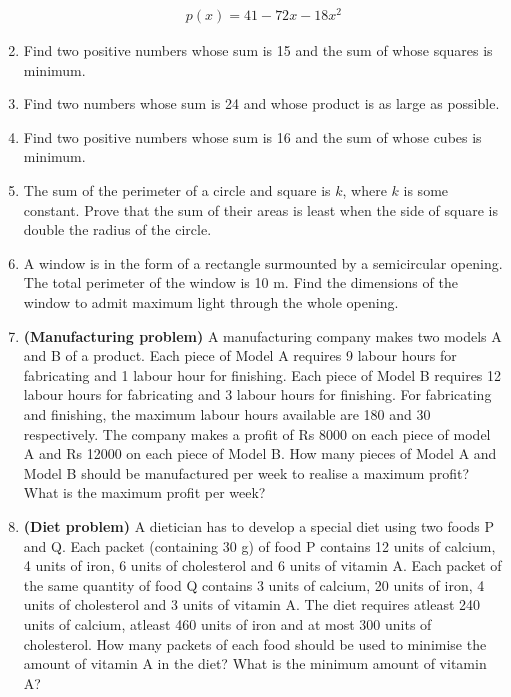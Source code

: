 \begin{enumerate}[label=\arabic*.,ref=\thesubsection.\theenumi]
\begin{align}
p(x) = 41-72x - 18x^2
\end{align}
%
\item Find two positive numbers whose sum is 15 and the sum of whose squares is minimum.
\item Find two numbers whose sum is 24 and whose product is as large as possible.
\item Find two positive numbers whose sum is 16 and the sum of whose cubes is minimum.
\item The sum of the perimeter of a circle and square is $k$, where $k$ is some constant. Prove that the sum of their areas is least when the side of square is double the radius of the circle.
\item A window is in the form of a rectangle surmounted by a semicircular opening. The total perimeter of the window is 10 m. Find the dimensions of the window to admit maximum light through the whole opening.
\item  \textbf{(Manufacturing problem)} A manufacturing company makes two models
A and B of a product. Each piece of Model A requires 9 labour hours for fabricating
and 1 labour hour for finishing. Each piece of Model B requires 12 labour hours for
fabricating and 3 labour hours for finishing. For fabricating and finishing, the maximum
labour hours available are 180 and 30 respectively. The company makes a profit of
Rs 8000 on each piece of model A and Rs 12000 on each piece of Model B. How many
pieces of Model A and Model B should be manufactured per week to realise a maximum
profit? What is the maximum profit per week?\\
\item \textbf {(Diet problem)} A dietician has to develop a special diet using two foods
P and Q. Each packet (containing 30 g) of food P contains 12 units of calcium, 4 units
of iron, 6 units of cholesterol and 6 units of vitamin A. Each packet of the same quantity
of food Q contains 3 units of calcium, 20 units of iron, 4 units of cholesterol and 3 units
of vitamin A. The diet requires atleast 240 units of calcium, atleast 460 units of iron and
at most 300 units of cholesterol. How many packets of each food should be used to
minimise the amount of vitamin A in the diet? What is the minimum amount of vitamin A?\\





\end{enumerate}
%
